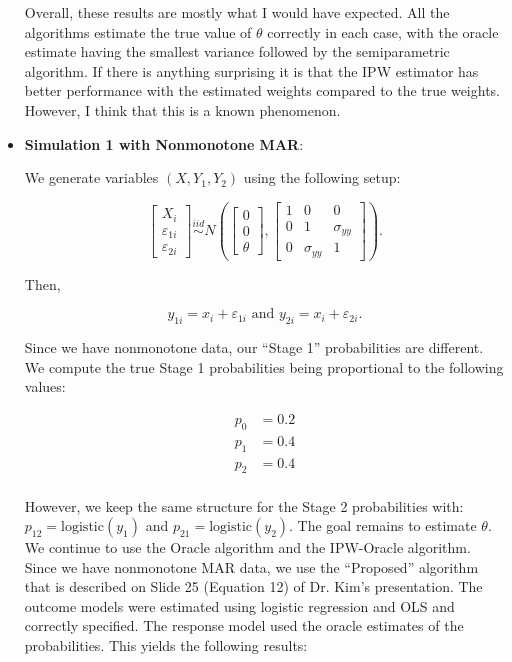 \documentclass[12pt]{article}
\newcommand{\logistic}{{\text{logistic}}}
\begin{document}
\begin{itemize}
    \newpage 

    
    
    

    Overall, these results are mostly what I would have expected. All the
    algorithms estimate the true value of $\theta$ correctly in each case, with
    the oracle estimate having the smallest variance followed by the
    semiparametric algorithm. If there is anything surprising it is that the IPW
    estimator has better performance with the estimated weights compared to the
    true weights. However, I think that this is a known phenomenon.

    \newpage 
    
    \item \textbf{Simulation 1 with Nonmonotone MAR}:

    We generate variables $(X, Y_1, Y_2)$ using the following setup:

    \[\begin{bmatrix}
    X_i \\ \varepsilon_{1i} \\ \varepsilon_{2i}
    \end{bmatrix} \stackrel{iid}{\sim}
    N\left(
    \begin{bmatrix}
        0 \\ 0 \\ \theta
    \end{bmatrix},
    \begin{bmatrix}
        1 & 0 & 0 \\
        0 & 1 & \sigma_{yy}\\
        0 & \sigma_{yy} & 1
    \end{bmatrix}
    \right).\]

    Then, 

    \[y_{1i} = x_i + \varepsilon_{1i} \text{ and } 
    y_{2i} = x_i + \varepsilon_{2i}.\]

    Since we have nonmonotone data, our ``Stage 1'' probabilities are
    different. We compute the true Stage 1 probabilities being proportional to
    the following values:
    
    \begin{align*}
        p_0 &= 0.2 \\
        p_1 &= 0.4 \\
        p_2 &= 0.4 \\
    \end{align*}
    
   However, we keep the same structure for the Stage 2 probabilities with:
   $p_{12} = \logistic(y_1)$ and $p_{21} = \logistic(y_2)$. The goal remains to
   estimate $\theta$. We continue to use the Oracle algorithm and the IPW-Oracle
   algorithm. Since we have nonmonotone MAR data, we use the ``Proposed''
   algorithm that is described on Slide 25 (Equation 12) of Dr. Kim's
   presentation. The outcome models were estimated using
   logistic regression and OLS and correctly specified. The response model used
   the oracle estimates of the probabilities. This yields the
   following results:
   

\end{itemize}
\end{document}
